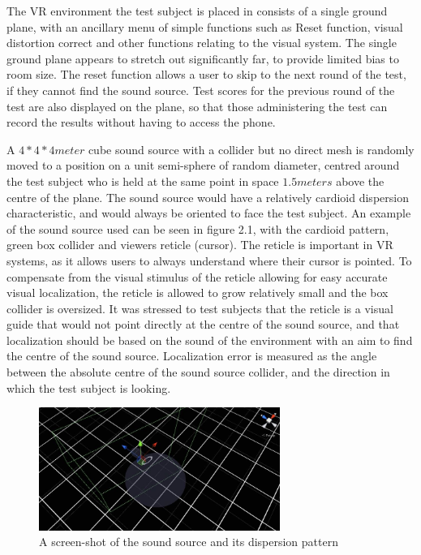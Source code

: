 \documentclass[paper=a4, fontsize=10pt, font=arial]{scrartcl} %
\numberwithin{equation}{section} %
\numberwithin{figure}{section} %
\numberwithin{table}{section} %
\begin{document}
The VR environment the test subject is placed in consists of a single ground plane, with an ancillary menu of simple functions such as Reset function, visual distortion correct and other functions relating to the visual system. The single ground plane appears to stretch out significantly far, to provide limited bias to room size. The reset function allows a user to skip to the next round of the test, if they cannot find the sound source. Test scores for the previous round of the test are also displayed on the plane, so that those administering the test can record the results without having to access the phone.

A $4*4*4meter$ cube sound source with a collider but no direct mesh is randomly moved to a position on a unit semi-sphere of random diameter, centred around the test subject who is held at the same point in space $1.5 meters$ above the centre of the plane. The sound source would have a relatively cardioid dispersion characteristic, and would always be oriented to face the test subject. An example of the sound source used can be seen in figure 2.1, with the cardioid pattern, green box collider and viewers reticle (cursor). The reticle is important in VR systems, as it allows users to always understand where their cursor is pointed. To compensate from the visual stimulus of the reticle allowing for easy accurate visual localization, the reticle is allowed to grow relatively small and the box collider is oversized. It was stressed to test subjects that the reticle is a visual guide that would not point directly at the centre of the sound source, and that localization should be based on the sound of the environment with an aim to find the centre of the sound source. Localization error is measured as the angle between the absolute centre of the sound source collider, and the direction in which the test subject is looking.

\begin{figure}[H]
\centering
\includegraphics[width=0.7\textwidth]{dispersion-pattern.JPG}
\centering
\caption{A screen-shot of the sound source and its dispersion pattern}
\end{figure}
\end{document}

